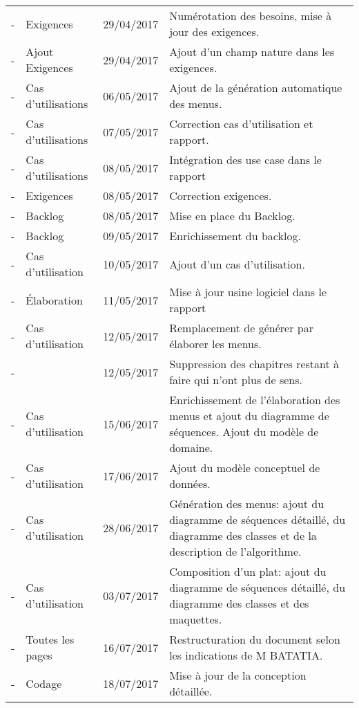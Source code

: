 \begin{longtable}{|c|p{3.5cm}|c|p{9cm}|}
  - & Exigences & 29/04/2017 & Numérotation des besoins, mise à jour des exigences.\\
  - & Ajout Exigences & 29/04/2017 & Ajout d'un champ nature dans les exigences.\\
  - & Cas d'utilisations & 06/05/2017 & Ajout de la génération automatique des menus.\\
  - & Cas d'utilisations & 07/05/2017 & Correction cas d'utilisation et rapport.\\
  - & Cas d'utilisations & 08/05/2017 & Intégration des use case dans le rapport\\
  - & Exigences & 08/05/2017 & Correction exigences.\\
  - & Backlog & 08/05/2017 & Mise en place du Backlog.\\
  - & Backlog & 09/05/2017 & Enrichissement du backlog.\\
  - & Cas d'utilisation  & 10/05/2017 & Ajout d'un cas d'utilisation.\\
  - & Élaboration  & 11/05/2017 & Mise à jour usine logiciel dans le rapport\\
  - & Cas d'utilisation & 12/05/2017 & Remplacement de générer par élaborer les menus.\\
  - & & 12/05/2017 & Suppression des chapitres restant à faire qui n'ont plus de sens.\\
  - & Cas d'utilisation & 15/06/2017 & Enrichissement de l'élaboration des menus et ajout du diagramme de séquences. Ajout du modèle de domaine.\\
  - & Cas d'utilisation & 17/06/2017 & Ajout du modèle conceptuel de données. \\
  - & Cas d'utilisation & 28/06/2017 & Génération des menus: ajout du diagramme de séquences détaillé, du diagramme des classes et de la description de l'algorithme.\\
  - & Cas d'utilisation & 03/07/2017 & Composition d'un plat: ajout du diagramme de séquences détaillé, du diagramme des classes et des maquettes.\\
  - & Toutes les pages & 16/07/2017 & Restructuration du document selon les indications de M BATATIA.\\
  - & Codage & 18/07/2017 & Mise à jour de la conception détaillée.\\ \hline
\end{longtable}
